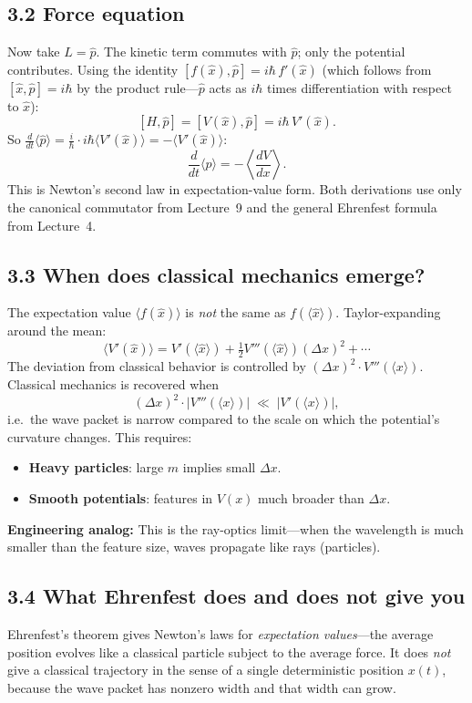 \documentclass[12pt,a4paper]{article}
\begin{document}
\subsection{3.2 Force equation}
Now take $L = \hat{p}$.  The kinetic term commutes with $\hat{p}$; only the potential contributes.  Using the identity $[f(\hat{x}),\hat{p}] = i\hbar\,f'(\hat{x})$ (which follows from $[\hat{x},\hat{p}]=i\hbar$ by the product rule---$\hat{p}$ acts as $i\hbar$ times differentiation with respect to $\hat{x}$):
\[
    [H,\hat{p}] = [V(\hat{x}),\hat{p}] = i\hbar\,V'(\hat{x}).
\]
So $\frac{d}{dt}\langle\hat{p}\rangle = \frac{i}{\hbar}\cdot i\hbar\langle V'(\hat{x})\rangle = -\langle V'(\hat{x})\rangle$:
\[
    \boxed{\frac{d}{dt}\langle \hat{p} \rangle = -\left\langle \frac{dV}{dx} \right\rangle.}
\]
This is Newton's second law in expectation-value form.  Both derivations use only the canonical commutator from Lecture~9 and the general Ehrenfest formula from Lecture~4.

\subsection{3.3 When does classical mechanics emerge?}
The expectation value $\langle f(\hat{x}) \rangle$ is \emph{not} the same as $f(\langle \hat{x} \rangle)$.  Taylor-expanding around the mean:
\[
    \langle V'(\hat{x})\rangle = V'(\langle\hat{x}\rangle) + \tfrac{1}{2}V'''(\langle\hat{x}\rangle)(\Delta x)^2 + \cdots
\]
The deviation from classical behavior is controlled by $(\Delta x)^2 \cdot V'''(\langle x\rangle)$.  Classical mechanics is recovered when
\[
    (\Delta x)^2 \cdot |V'''(\langle x\rangle)| \;\ll\; |V'(\langle x\rangle)|,
\]
i.e.\ the wave packet is narrow compared to the scale on which the potential's curvature changes.  This requires:
\begin{itemize}[nosep]
    \item \textbf{Heavy particles}: large $m$ implies small $\Delta x$.
    \item \textbf{Smooth potentials}: features in $V(x)$ much broader than $\Delta x$.
\end{itemize}

\medskip
\noindent\textbf{Engineering analog:} This is the ray-optics limit---when the wavelength is much smaller than the feature size, waves propagate like rays (particles).

\subsection{3.4 What Ehrenfest does and does not give you}
Ehrenfest's theorem gives Newton's laws for \emph{expectation values}---the average position evolves like a classical particle subject to the average force.  It does \emph{not} give a classical trajectory in the sense of a single deterministic position $x(t)$, because the wave packet has nonzero width and that width can grow.
\end{document}
